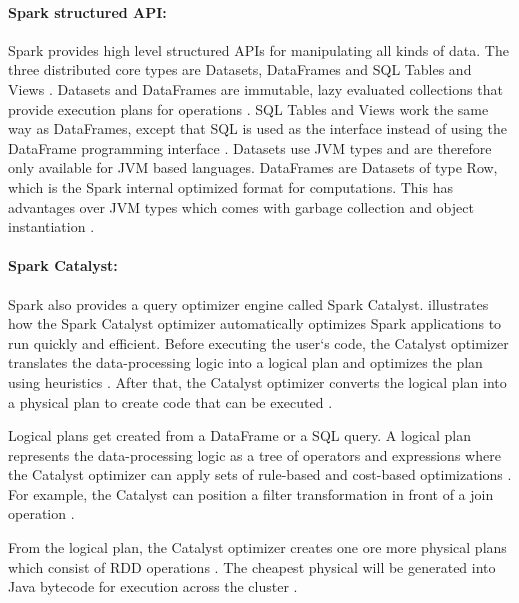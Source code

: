 \paragraph{Spark structured API:}
Spark provides high level structured APIs for manipulating all kinds of data. The three distributed core types are Datasets, DataFrames and SQL Tables and Views \cite{Chambers2018Spark}.
Datasets and DataFrames are immutable, lazy evaluated collections that provide execution plans for operations \cite{Chambers2018Spark}. SQL Tables and Views work the same way as DataFrames, except that SQL is used as the interface instead of using the DataFrame programming interface \cite{Chambers2018Spark}.
Datasets use JVM types and are therefore only available for JVM based languages. DataFrames are Datasets of type Row, which is the Spark internal optimized format for computations. This has advantages over JVM types which comes with garbage collection and object instantiation \cite{Chambers2018Spark}.


\paragraph{Spark Catalyst:}
Spark also provides a query optimizer engine called Spark Catalyst.  illustrates how the Spark Catalyst optimizer automatically optimizes Spark applications to run quickly and efficient.
Before executing the user`s code, the Catalyst optimizer translates the data-processing logic into a logical plan and optimizes the plan using heuristics \cite{Hien2018Spark}. After that, the Catalyst optimizer converts the logical plan into a physical plan to create code that can be executed \cite{Hien2018Spark}.


Logical plans get created from a DataFrame or a SQL query. A logical plan represents the data-processing logic as a tree of operators and expressions where the Catalyst optimizer can apply sets of rule-based and cost-based optimizations \cite{Hien2018Spark}.
For example, the Catalyst can position a filter transformation in front of a join operation \cite{Hien2018Spark}.

From the logical plan, the Catalyst optimizer creates one ore more physical plans which consist of RDD operations \cite{Chambers2018Spark}. The cheapest physical will be generated into Java bytecode for execution across the cluster \cite{Hien2018Spark}.

